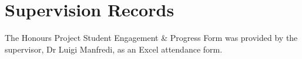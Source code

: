 \chapter{Supervision Records}
\label{app:supervision}


The Honours Project Student Engagement \& Progress Form was provided by the supervisor, Dr Luigi Manfredi, as an Excel attendance form.